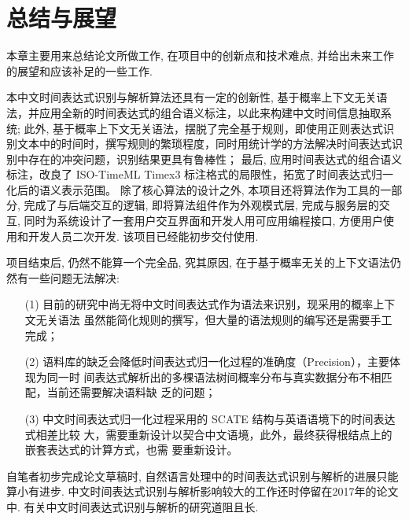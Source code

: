 
\chapter{总结与展望}

本章主要用来总结论文所做工作, 在项目中的创新点和技术难点, 并给出未来工作的展望和应该补足的一些工作.

本中文时间表达式识别与解析算法还具有一定的创新性, 基于概率上下文无关语法，并应用全新的时间表达式的组合语义标注，以此来构建中文时间信息抽取系统;
此外, 基于概率上下文无关语法，摆脱了完全基于规则，即使用正则表达式识别文本中的时间时，撰写规则的繁琐程度，同时用统计学的方法解决时间表达式识别中存在的冲突问题，识别结果更具有鲁棒性；
最后, 应用时间表达式的组合语义标注，改良了 ISO-TimeML Timex3 标注格式的局限性，拓宽了时间表达式归一化后的语义表示范围。
除了核心算法的设计之外, 本项目还将算法作为工具的一部分, 完成了与后端交互的逻辑, 即将算法组件作为外观模式层, 完成与服务层的交互, 同时为系统设计了一套用户交互界面和开发人用可应用编程接口, 
方便用户使用和开发人员二次开发. 该项目已经能初步交付使用.

项目结束后, 仍然不能算一个完全品, 究其原因, 在于基于概率无关的上下文语法仍然有一些问题无法解决:
\begin{enumerate}
    \item[(1)] 目前的研究中尚无将中文时间表达式作为语法来识别，现采用的概率上下文无关语法
    虽然能简化规则的撰写，但大量的语法规则的编写还是需要手工完成；
    \item[(2)] 语料库的缺乏会降低时间表达式归一化过程的准确度（Precision），主要体现为同一时
    间表达式解析出的多棵语法树间概率分布与真实数据分布不相匹配，当前还需要解决语料缺
    乏的问题；
    \item[(3)] 中文时间表达式归一化过程采用的 SCATE 结构与英语语境下的时间表达式相差比较
    大，需要重新设计以契合中文语境，此外，最终获得根结点上的嵌套表达式的计算方式，也需
    要重新设计。
\end{enumerate}

自笔者初步完成论文草稿时, 自然语言处理中的时间表达式识别与解析的进展只能算小有进步. 
中文时间表达式识别与解析影响较大的工作还时停留在2017年的论文中. 有关中文时间表达式识别与解析的研究道阻且长.



